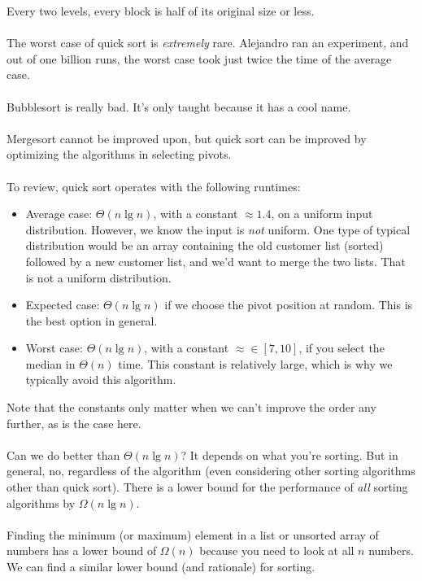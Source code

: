 \documentclass[]{article}
\theoremstyle{definition}
\newcommand{\lecture}[1]{\marginpar{{\footnotesize $\leftarrow$ \underline{#1}}}}
\begin{document}
				Every two levels, every block is half of its original size or less.
				\\ \\
				The worst case of quick sort is \emph{extremely} rare. Alejandro ran an experiment, and out of one billion runs, the worst case took just twice the time of the average case.
				\\ \\
				Bubblesort is really bad. It's only taught because it has a cool name.
				\\ \\
				Mergesort cannot be improved upon, but quick sort can be improved by optimizing the algorithms in selecting pivots.
				\lecture{January 31, 2013}
				\\ \\
				To review, quick sort operates with the following runtimes:
				\begin{itemize}
					\item Average case: $\Theta(n \lg n)$, with a constant $\approx 1.4$, on a uniform input distribution. However, we know the input is \emph{not} uniform. One type of typical distribution would be an array containing the old customer list (sorted) followed by a new customer list, and we'd want to merge the two lists. That is not a uniform distribution.
					\item Expected case: $\Theta(n \lg n)$ if we choose the pivot position at random. This is the best option in general.
					\item Worst case: $\Theta(n \lg n)$, with a constant $\approx \in [7, 10]$, if you select the median in $\Theta(n)$ time. This constant is relatively large, which is why we typically avoid this algorithm.
				\end{itemize}
				Note that the constants only matter when we can't improve the order any further, as is the case here.
				\\ \\
				Can we do better than $\Theta(n \lg n)$? It depends on what you're sorting. But in general, no, regardless of the algorithm (even considering other sorting algorithms other than quick sort). There is a lower bound for the performance of \emph{all} sorting algorithms by $\Omega(n \lg n)$.
				\\ \\
				Finding the minimum (or maximum) element in a list or unsorted array of numbers has a lower bound of $\Omega(n)$ because you need to look at all $n$ numbers. We can find a similar lower bound (and rationale) for sorting.
\end{document}
